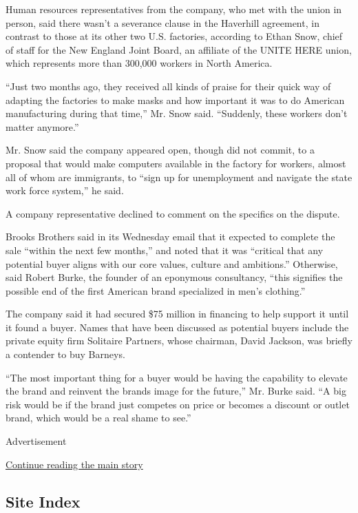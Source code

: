 Human resources representatives from the company, who met with the union
in person, said there wasn't a severance clause in the Haverhill
agreement, in contrast to those at its other two U.S. factories,
according to Ethan Snow, chief of staff for the New England Joint Board,
an affiliate of the UNITE HERE union, which represents more than 300,000
workers in North America.

``Just two months ago, they received all kinds of praise for their quick
way of adapting the factories to make masks and how important it was to
do American manufacturing during that time,'' Mr. Snow said. ``Suddenly,
these workers don't matter anymore.''

Mr. Snow said the company appeared open, though did not commit, to a
proposal that would make computers available in the factory for workers,
almost all of whom are immigrants, to ``sign up for unemployment and
navigate the state work force system,'' he said.

A company representative declined to comment on the specifics on the
dispute.

Brooks Brothers said in its Wednesday email that it expected to complete
the sale ``within the next few months,'' and noted that it was
``critical that any potential buyer aligns with our core values, culture
and ambitions.'' Otherwise, said Robert Burke, the founder of an
eponymous consultancy, ``this signifies the possible end of the first
American brand specialized in men's clothing.''

The company said it had secured \$75 million in financing to help
support it until it found a buyer. Names that have been discussed as
potential buyers include the private equity firm Solitaire Partners,
whose chairman, David Jackson, was briefly a contender to buy Barneys.

``The most important thing for a buyer would be having the capability to
elevate the brand and reinvent the brands image for the future,'' Mr.
Burke said. ``A big risk would be if the brand just competes on price or
becomes a discount or outlet brand, which would be a real shame to
see.''

Advertisement

\protect\hyperlink{after-bottom}{Continue reading the main story}

\hypertarget{site-index}{%
\subsection{Site Index}\label{site-index}}

